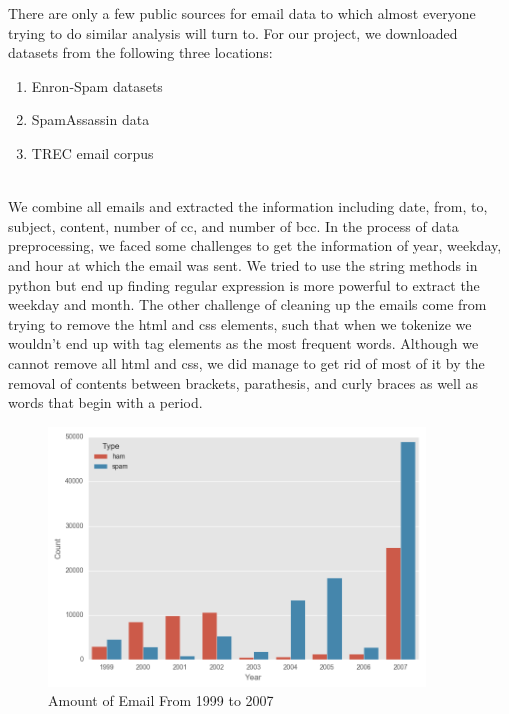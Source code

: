 There are only a few public sources for email data to which almost everyone trying to do similar analysis will turn to. For our project, we downloaded datasets from the following three locations:

\begin{enumerate}
\item Enron-Spam datasets
\item SpamAssassin data
\item TREC email corpus
\end{enumerate}\\

We combine all emails and extracted the information including date, from, to, subject, content, number of cc, and number of bcc. In the process of data preprocessing, we faced some challenges to get the information of year, weekday, and hour at which the email was sent. We tried to use the string methods in python but end up finding regular expression is more powerful to extract the weekday and month. The other challenge of cleaning up the emails come from trying to remove the html and css elements, such that when we tokenize we wouldn't end up with tag elements as the most frequent words. Although we cannot remove all html and css, we did manage to get rid of most of it by the removal of contents between brackets, parathesis, and curly braces as well as words that begin with a period. \\

\begin{figure}[H]
\includegraphics[width=10cm]{Email_count_each_year.png}
\centering
\caption{Amount of Email From 1999 to 2007}
\label{email_every_year}
\end{figure}\\

